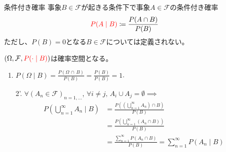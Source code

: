 \documentclass[lualatex,handout]{beamer}
\newcommand{\mycolor}[2]{%
  \begingroup
  \colorlet{currentcolor}{.}%
  \color{#1}#2%
  \color{currentcolor}%
  \endgroup
}
\newcommand{\emm}[1]{\mycolor{red}{#1}}
\theoremstyle{definition}
\begin{document}
\begin{frame}{条件付き確率}
事象$B\in\mathcal{F}$が起きる条件下で事象$A\in\mathcal{F}$の条件付き確率
\begin{align*}
\emm{P(A\mid B)} &\coloneq \frac{P(A\cap B)}{P(B)}
\end{align*}
ただし、$P(B)=0$となる$B\in\mathcal{F}$については定義されない。

\vspace{1em}
$(\Omega, \mathcal{F}, \emm{P(\cdot\mid B)})$は確率空間となる。

\begin{enumerate}
\item $P(\Omega\mid B) = \frac{P(\Omega\, \cap\, B)}{P(B)} = \frac{P(B)}{P(B)} = 1$.
\item[2'.] $\forall (A_n\in\mathcal{F})_{n=1,\dotsc}$, $\forall i\ne j,\, A_i\cup A_j=\emptyset\implies$
\begin{align*}
 P\left(\bigcup_{n=1}^\infty A_n\mid B\right)&=
\frac{P\left(\left(\bigcup_{n=1}^\infty A_n\right)\cap B\right)}{P(B)}\\
&= \frac{P\left(\bigcup_{n=1}^\infty \left(A_n\cap B\right)\right)}{P(B)}\\
&= \frac{\sum_{n=1}^\infty P\left(A_n\cap B\right)}{P(B)} = \sum_{n=1}^\infty P(A_n\mid B)
\end{align*}
\end{enumerate}
\end{frame}
\end{document}
